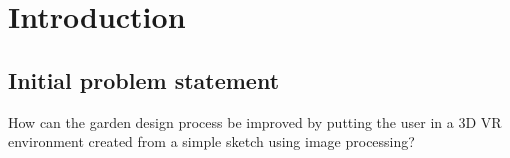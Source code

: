 \chapter{Introduction}
	
	
	\section{Initial problem statement}
	How can the garden design process be improved by putting the user in a 3D VR environment created from a simple sketch using image processing?
	